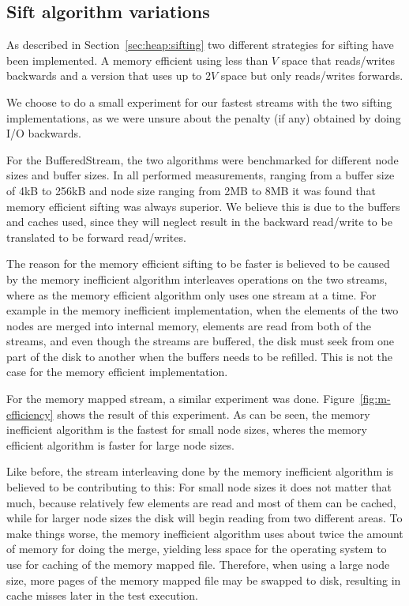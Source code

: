 
\subsection{Sift algorithm variations}
\label{sec:sifting}
As described in Section~\ref{sec:heap:sifting} two different strategies for sifting have been implemented. A memory efficient using less than $V$ space that reads/writes backwards and a version that uses up to $2V$ space but only reads/writes forwards.

We choose to do a small experiment for our fastest streams with the two sifting implementations, as we were unsure about the penalty (if any) obtained by doing I/O backwards.

For the BufferedStream, the two algorithms were benchmarked for different node sizes and buffer sizes. In all performed measurements, ranging from a buffer size of 4kB to 256kB and node size ranging from 2MB to 8MB it was found that memory efficient sifting was always superior. We believe this is due to the buffers and caches used, since they will neglect result in the backward read/write to be translated to be forward read/writes.

The reason for the memory efficient sifting to be faster is believed to be caused by the memory inefficient algorithm interleaves operations on the two streams, where as the memory efficient algorithm only uses one stream at a time. For example in the memory inefficient implementation, when the elements of the two nodes are merged into internal memory, elements are read from both of the streams, and even though the streams are buffered, the disk must seek from one part of the disk to another when the buffers needs to be refilled. This is not the case for the memory efficient implementation.

For the memory mapped stream, a similar experiment was done. Figure~\ref{fig:m-efficiency} shows the result of this experiment. As can be seen, the memory inefficient algorithm is the fastest for small node sizes, wheres the memory efficient algorithm is faster for large node sizes.

Like before, the stream interleaving done by the memory inefficient algorithm is believed to be contributing to this: For small node sizes it does not matter that much, because relatively few elements are read and most of them can be cached, while for larger node sizes the disk will begin reading from two different areas. To make things worse, the memory inefficient algorithm uses about twice the amount of memory for doing the merge, yielding less space for the operating system to use for caching of the memory mapped file. Therefore, when using a large node size, more pages of the memory mapped file may be swapped to disk, resulting in cache misses later in the test execution.

